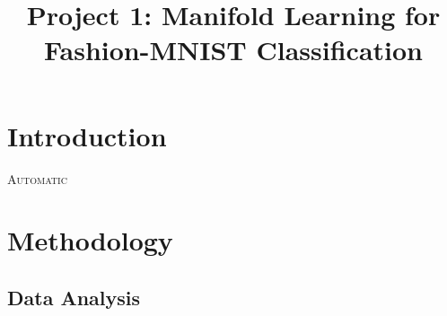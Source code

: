 \documentclass[conference]{IEEEtran}
\begin{document}
\title{Project 1: Manifold Learning for Fashion-MNIST Classification}
\author{

}

\maketitle


\begin{abstract}
	
\end{abstract} 

\begin{IEEEkeywords}

\end{IEEEkeywords}


\section{Introduction} 

\lettrine{A}{utomatic}


\section{Methodology} \label{Methodology}

	\subsection{Data Analysis}
	
	
	
	
\end{document}
